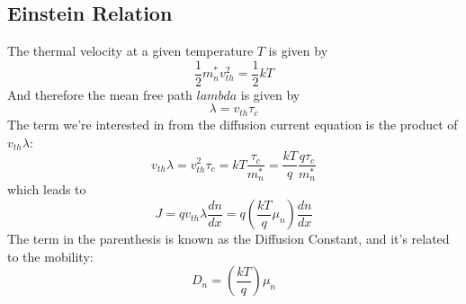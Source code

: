 \subsection{Einstein Relation}
The thermal velocity at a given temperature $T$ is given by
    \begin{equation}
        {\frac{1}{2}}m_n^*v_{th}^2 = {\frac{1}{2}}kT
    \end{equation}
And therefore the mean free path $lambda$ is given by
    \begin{equation}
        \lambda  = {v_{th}}{\tau _c}
    \end{equation}
The term we're interested in from the diffusion current equation is the product of $v_{th} \lambda$:
    \begin{equation}
        {v_{th}}\lambda  = v_{th}^2{\tau _c} = kT\frac{{{\tau _c}}}{{m_n^*}} = \frac{{kT}}{q}\frac{{q{\tau _c}}}{{m_n^*}}
    \end{equation}
which leads to
\begin{equation}
        J = q{v_{th}}\lambda \frac{{dn}}{{dx}} = q\left( {\frac{{kT}}{q}{\mu _n}} \right)\frac{{dn}}{{dx}}
\end{equation}
The term in the parenthesis is known as the Diffusion Constant, and it's related to the mobility: 
\begin{equation}
        {D_n} = \left( {\frac{{kT}}{q}} \right){\mu _n}
\end{equation}
